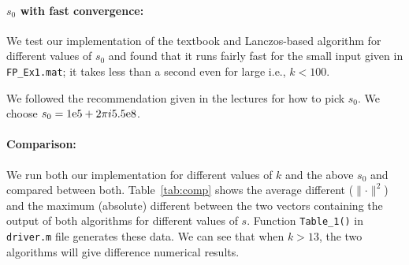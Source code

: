 \paragraph{$s_0$ with fast convergence:} We test our implementation of the textbook and Lanczos-based algorithm for different values of $s_{0}$ and found that it runs fairly fast for the small input given in \texttt{FP\_Ex1.mat}; it takes less than a second even for large i.e., $k < 100$. 

We followed the recommendation given in the lectures for how to pick $s_{0}$. We choose $s_{0} = {1}\mathrm{e}{5} + 2\pi i {5.5}\mathrm{e}{8} $. 

\paragraph{Comparison:} We run both our implementation for different values of $k$ and the above $s_{0}$ and compared between both. Table~\ref{tab:comp} shows the average different ($\parallel \cdot \parallel^{2}$) and the maximum (absolute) different between the two vectors containing the output of both algorithms for different values of $s$. Function \texttt{Table\_1()} in \texttt{driver.m} file generates these data. We can see that when $k>13$, the two algorithms will give difference numerical results. 

